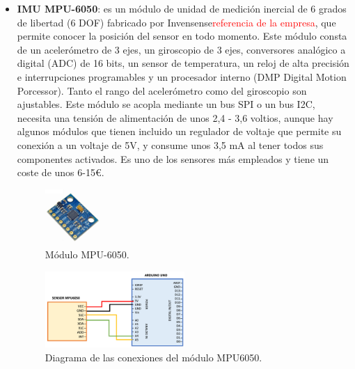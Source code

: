 \begin{itemize}
    \item \textbf{IMU MPU-6050}\cite{MPU6050_1,MPU6050_2}: es un módulo de unidad de medición inercial de 6 grados de libertad (6 DOF) fabricado por Invensense\textcolor{red}{referencia de la empresa}, que permite conocer la posición del sensor en todo momento. Este módulo consta de un acelerómetro de 3 ejes, un giroscopio de 3 ejes, conversores analógico a digital (ADC) de 16 bits, un sensor de temperatura, un reloj de alta precisión e interrupciones programables y un procesador interno (DMP Digital Motion Porcessor). Tanto el rango del acelerómetro como del giroscopio son ajustables. Este módulo se acopla mediante un bus SPI o un bus I2C, necesita una tensión de alimentación de unos 2,4 - 3,6 voltios, aunque hay algunos módulos que tienen incluido un regulador de voltaje que permite su conexión a un voltaje de 5V, y consume unos 3,5 mA al tener todos sus componentes activados. Es uno de los sensores más empleados y tiene un coste de unos 6-15€.
\begin{figure}[h!]
    \centering
    \includegraphics[width=0.2\textwidth]{img/imgMPU6050.jpg}
    \caption{Módulo MPU-6050\cite{imgMPU6050}.}
    \label{fig:imgMPU6050} %
\end{figure}
\begin{figure}[h!]
    \centering
    \includegraphics[width=0.5\textwidth]{img/MPU6050.png}
    \caption{Diagrama de las conexiones del módulo MPU6050.}
    \label{fig:MPU6050} %
\end{figure}


\end{itemize}
